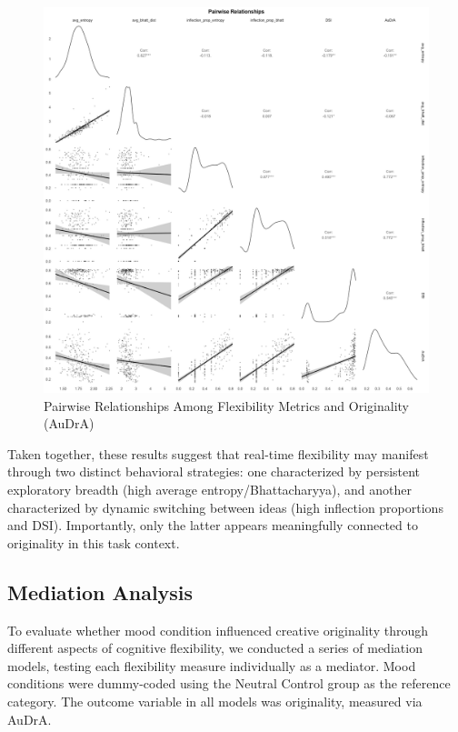 \documentclass[../MA_Thesis.tex]{subfiles}
\begin{document}
\begin{figure}[H]
  \centering
  \includegraphics[width=\textwidth]{../analysis/results/main_results/correlation/ggpairs_flexibility_and_outcome.png}
  \caption{Pairwise Relationships Among Flexibility Metrics and Originality (AuDrA)}
  \label{fig:pairwise_flexibility_originality}
\end{figure}

Taken together, these results suggest that real-time flexibility may manifest through two distinct behavioral strategies: one characterized by persistent exploratory breadth (high average entropy/Bhattacharyya), and another characterized by dynamic switching between ideas (high inflection proportions and DSI). Importantly, only the latter appears meaningfully connected to originality in this task context.

\subsection*{Mediation Analysis}

To evaluate whether mood condition influenced creative originality through different aspects of cognitive flexibility, we conducted a series of mediation models, testing each flexibility measure individually as a mediator. Mood conditions were dummy-coded using the Neutral Control group as the reference category. The outcome variable in all models was originality, measured via AuDrA.
\end{document}
